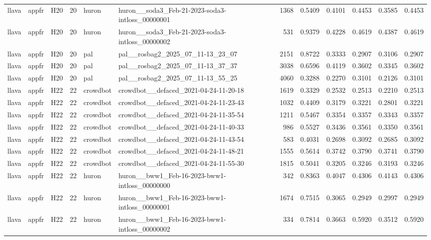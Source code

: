 \begin{table}[tbp]
\begin{tabular}{lllrllrrrrrr}
llava & appfr & H20 & 20 & huron & huron\_\_soda3\_Feb-21-2023-soda3-intloss\_00000001 & 1368 & 0.5409 & 0.4101 & 0.4453 & 0.3585 & 0.4453 \\
llava & appfr & H20 & 20 & huron & huron\_\_soda3\_Feb-21-2023-soda3-intloss\_00000002 & 531 & 0.9379 & 0.4228 & 0.4619 & 0.4387 & 0.4619 \\
llava & appfr & H20 & 20 & pal & pal\_\_rosbag2\_2025\_07\_11-13\_23\_07 & 2151 & 0.8722 & 0.3333 & 0.2907 & 0.3106 & 0.2907 \\
llava & appfr & H20 & 20 & pal & pal\_\_rosbag2\_2025\_07\_11-13\_37\_37 & 3038 & 0.6596 & 0.4119 & 0.3602 & 0.3345 & 0.3602 \\
llava & appfr & H20 & 20 & pal & pal\_\_rosbag2\_2025\_07\_11-13\_55\_25 & 4060 & 0.3288 & 0.2270 & 0.3101 & 0.2126 & 0.3101 \\
llava & appfr & H22 & 22 & crowdbot & crowdbot\_\_defaced\_2021-04-24-11-20-18 & 1619 & 0.3329 & 0.2532 & 0.2513 & 0.2210 & 0.2513 \\
llava & appfr & H22 & 22 & crowdbot & crowdbot\_\_defaced\_2021-04-24-11-23-43 & 1032 & 0.4409 & 0.3179 & 0.3221 & 0.2801 & 0.3221 \\
llava & appfr & H22 & 22 & crowdbot & crowdbot\_\_defaced\_2021-04-24-11-35-54 & 1211 & 0.5467 & 0.3354 & 0.3357 & 0.3343 & 0.3357 \\
llava & appfr & H22 & 22 & crowdbot & crowdbot\_\_defaced\_2021-04-24-11-40-33 & 986 & 0.5527 & 0.3436 & 0.3561 & 0.3350 & 0.3561 \\
llava & appfr & H22 & 22 & crowdbot & crowdbot\_\_defaced\_2021-04-24-11-43-54 & 583 & 0.4031 & 0.2698 & 0.3092 & 0.2685 & 0.3092 \\
llava & appfr & H22 & 22 & crowdbot & crowdbot\_\_defaced\_2021-04-24-11-48-21 & 1555 & 0.5614 & 0.3742 & 0.3790 & 0.3741 & 0.3790 \\
llava & appfr & H22 & 22 & crowdbot & crowdbot\_\_defaced\_2021-04-24-11-55-30 & 1815 & 0.5041 & 0.3205 & 0.3246 & 0.3193 & 0.3246 \\
llava & appfr & H22 & 22 & huron & huron\_\_bww1\_Feb-16-2023-bww1-intloss\_00000000 & 342 & 0.8363 & 0.4047 & 0.4306 & 0.4143 & 0.4306 \\
llava & appfr & H22 & 22 & huron & huron\_\_bww1\_Feb-16-2023-bww1-intloss\_00000001 & 1674 & 0.7515 & 0.3065 & 0.2949 & 0.2997 & 0.2949 \\
llava & appfr & H22 & 22 & huron & huron\_\_bww1\_Feb-16-2023-bww1-intloss\_00000002 & 334 & 0.7814 & 0.3663 & 0.5920 & 0.3512 & 0.5920 \\

\end{tabular}
\end{table}
